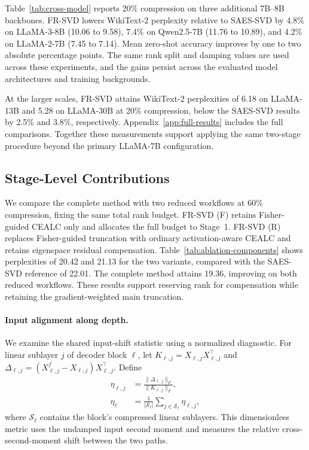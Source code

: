 \documentclass[11pt]{article}
\begin{document}
Table~\ref{tab:cross-model} reports 20\% compression on three additional 7B--8B backbones. FR-SVD lowers WikiText-2 perplexity relative to SAES-SVD by 4.8\% on LLaMA-3-8B (10.06 to 9.58), 7.4\% on Qwen2.5-7B (11.76 to 10.89), and 4.2\% on LLaMA-2-7B (7.45 to 7.14). Mean zero-shot accuracy improves by one to two absolute percentage points. The same rank split and damping values are used across these experiments, and the gains persist across the evaluated model architectures and training backgrounds.



At the larger scales, FR-SVD attains WikiText-2 perplexities of 6.18 on LLaMA-13B and 5.28 on LLaMA-30B at 20\% compression, below the SAES-SVD results by 2.5\% and 3.8\%, respectively. Appendix~\ref{app:full-results} includes the full comparisons. Together these measurements support applying the same two-stage procedure beyond the primary LLaMA-7B configuration.

\subsection{Stage-Level Contributions}

We compare the complete method with two reduced workflows at 60\% compression, fixing the same total rank budget. FR-SVD (F) retains Fisher-guided CEALC only and allocates the full budget to Stage~1. FR-SVD (R) replaces Fisher-guided truncation with ordinary activation-aware CEALC and retains eigenspace residual compensation. Table~\ref{tab:ablation-components} shows perplexities of 20.42 and 21.13 for the two variants, compared with the SAES-SVD reference of 22.01. The complete method attains 19.36, improving on both reduced workflows. These results support reserving rank for compensation while retaining the gradient-weighted main truncation.



\paragraph{Input alignment along depth.}
We examine the shared input-shift statistic using a normalized diagnostic. For linear sublayer $j$ of decoder block $\ell$, let $K_{\ell,j}=X_{\ell,j}X_{\ell,j}^\top$ and $\Delta_{\ell,j}=(X_{\ell,j}^f-X_{\ell,j})X_{\ell,j}^\top$. Define
\begin{equation}
\begin{aligned}
\eta_{\ell,j}&=\frac{\|\Delta_{\ell,j}\|_F}{\|K_{\ell,j}\|_F},\\
\eta_\ell&=\frac1{|\mathcal S_\ell|}
\sum_{j\in\mathcal S_\ell}\eta_{\ell,j},
\end{aligned}
\label{eq:input-alignment-shift}
\end{equation}
where $\mathcal S_\ell$ contains the block's compressed linear sublayers. This dimensionless metric uses the undamped input second moment and measures the relative cross-second-moment shift between the two paths.
\end{document}
